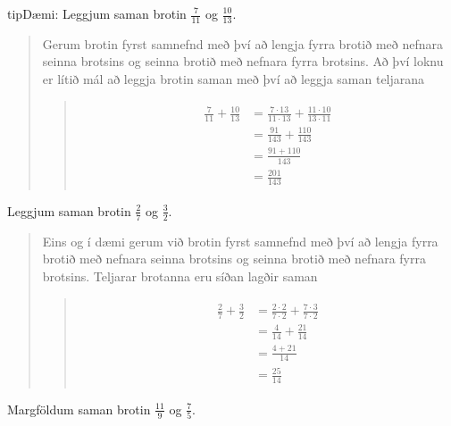 \documentclass[a4paper,10pt,icelandic]{sphinxmanual}
\begin{document}
\begin{sphinxadmonition}{tip}{Dæmi:}
 Leggjum saman brotin \(\frac{7}{11}\) og \(\frac{10}{13}\).
\begin{quote}

Gerum brotin fyrst samnefnd með því að lengja fyrra brotið með nefnara seinna brotsins og seinna brotið með nefnara fyrra brotsins.
Að því loknu er lítið mál að leggja brotin saman með því að leggja saman teljarana
\begin{quote}
\begin{equation*}
\begin{split}\begin{aligned}
  \frac{7}{11}+\frac{10}{13}&=\frac{7 \cdot 13}{11 \cdot 13}+ \frac{11 \cdot 10}{13 \cdot 11}\\
   &= \frac{91}{143}+\frac{110}{143}\\
   &=\frac{91+110}{143}\\
   &=\frac{201}{143}
\end{aligned}\end{split}
\end{equation*}\end{quote}
\end{quote}

 Leggjum saman brotin \(\frac{2}{7}\) og \(\frac{3}{2}\).
\begin{quote}

Eins og í dæmi  gerum við brotin fyrst samnefnd með því að lengja fyrra brotið með nefnara seinna brotsins og seinna brotið með nefnara fyrra brotsins.
Teljarar brotanna eru síðan lagðir saman
\begin{quote}
\begin{equation*}
\begin{split}\begin{aligned}
\frac{2}{7}+\frac{3}{2}&=\frac{2 \cdot 2}{7 \cdot 2} + \frac{7 \cdot 3}{7 \cdot 2}\\
&=\frac{4}{14}+\frac{21}{14}\\
&=\frac{4+21}{14}\\
&=\frac{25}{14}
\end{aligned}\end{split}
\end{equation*}\end{quote}
\end{quote}

 Margföldum saman brotin \(\frac{11}{9}\) og \(\frac{7}{5}\).
\begin{quote}


\end{quote}
\end{sphinxadmonition}
\end{document}
